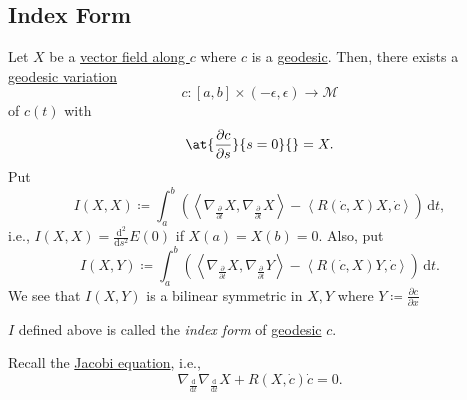 \subsection{Index Form}
Let \(X\) be a \hyperref[def:vector-field-along-curve]{vector field along \(c\)} where \(c\) is a \hyperref[def:geodesic]{geodesic}. Then, there exists a \hyperref[def:geodesic-variation]{geodesic variation}
\[
	c\colon [a, b] \times (-\epsilon , \epsilon )\to \mathcal{M}
\]
of \(c(t)\) with
\[
	\at{\frac{\partial c}{\partial s} }{s=0}{} = X.
\]
Put
\[
	I(X, X)
	\coloneqq \int_{a}^{b} \left( \left\langle \nabla _{\frac{\partial }{\partial t} }X, \nabla _{\frac{\partial }{\partial t} } X \right\rangle - \left\langle R(\dot{c}, X )X, \dot{c}  \right\rangle  \right)  \,\mathrm{d}t,
\]
i.e., \(I(X, X) = \frac{\mathrm{d}^2}{\mathrm{d}s^2} E(0)\) if \(X(a) = X(b) = 0\). Also, put
\[
	I(X, Y)
	\coloneqq \int_{a}^{b} \left( \left\langle \nabla _{\frac{\partial }{\partial t} } X, \nabla _{\frac{\partial }{\partial t} } Y \right\rangle - \left\langle R(\dot{c} , X) Y, \dot{c} \right\rangle \right)  \,\mathrm{d}t.
\]
We see that \(I(X, Y)\) is a bilinear symmetric in \(X, Y\) where \(Y\coloneqq \frac{\partial c}{\partial x} \)

\begin{definition}\label{def:index-form}
	\(I\) defined above is called the \emph{index form} of \hyperref[def:geodesic]{geodesic} \(c\).
\end{definition}

\begin{prev}
	Recall the \hyperref[eq:Jacobi]{Jacobi equation}, i.e.,
	\[
		\nabla _{\frac{\mathrm{d}}{\mathrm{d}t} }\nabla _{\frac{\mathrm{d}}{\mathrm{d}t} }X + R(X, \dot{c} )\dot{c} = 0.
	\]
\end{prev}

